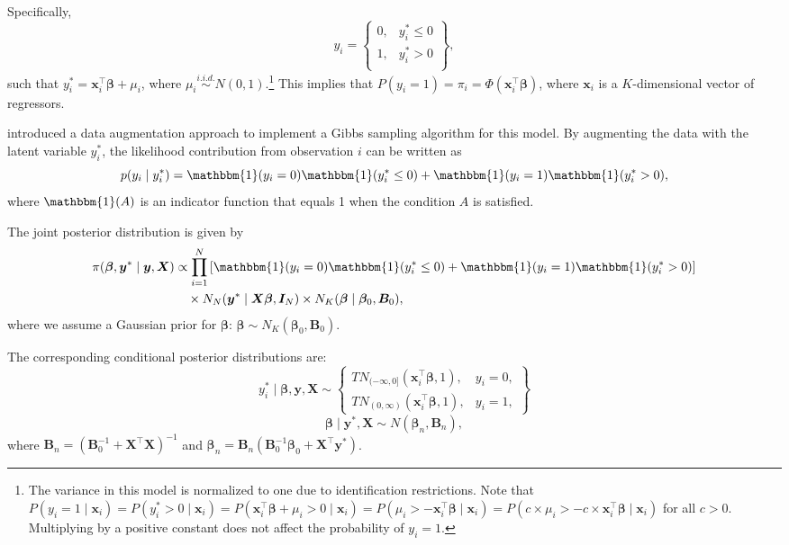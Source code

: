 Specifically,
\begin{equation*}
	y_i =
	\begin{Bmatrix}
		0, & y_i^* \leq 0 \\ 
		1, & y_i^* > 0 \\ 
	\end{Bmatrix},
\end{equation*}
such that $y_i^* = \bm{x}_i^{\top}\bm{\beta} + \mu_i$, where $\mu_i \stackrel{i.i.d.}{\sim} N(0,1)$.\footnote{The variance in this model is normalized to one due to identification restrictions. Note that $P(y_i = 1 \mid \bm{x}_i) = P(y_i^* > 0 \mid \bm{x}_i) = P(\bm{x}_i^{\top}\bm{\beta} + \mu_i > 0 \mid \bm{x}_i) = P(\mu_i > -\bm{x}_i^{\top}\bm{\beta} \mid \bm{x}_i) = P(c \times \mu_i > -c \times \bm{x}_i^{\top}\bm{\beta} \mid \bm{x}_i)$ for all $c > 0$. Multiplying by a positive constant does not affect the probability of $y_i = 1$.} 
This implies that $P(y_i = 1) = \pi_i = \Phi(\bm{x}_i^{\top}\bm{\beta})$, where $\bm{x}_i$ is a $K$-dimensional vector of regressors.

\cite{Albert1993} introduced a data augmentation approach \cite{Tanner1987} to implement a Gibbs sampling algorithm for this model. By augmenting the data with the latent variable $y_i^*$, the likelihood contribution from observation $i$ can be written as
\[
p(y_i \mid y_i^*) = \mathbbm{1}(y_i = 0)\mathbbm{1}(y_i^* \leq 0) + \mathbbm{1}(y_i = 1)\mathbbm{1}(y_i^* > 0),
\]
where $\mathbbm{1}(A)$ is an indicator function that equals 1 when the condition $A$ is satisfied.

The joint posterior distribution is given by
\begin{align*}
	\pi(\bm{\beta}, \bm{y}^* \mid \bm{y}, \bm{X}) 
	&\propto \prod_{i=1}^N 
	\left[\mathbbm{1}(y_i = 0)\mathbbm{1}(y_i^* \leq 0) + \mathbbm{1}(y_i = 1)\mathbbm{1}(y_i^* > 0)\right] \\
	&\quad \times N_N(\bm{y}^* \mid \bm{X}\bm{\beta}, \bm{I}_N) 
	\times N_K(\bm{\beta} \mid \bm{\beta}_0, \bm{B}_0),
\end{align*}
where we assume a Gaussian prior for $\bm{\beta}$: $\bm{\beta} \sim N_K(\bm{\beta}_0, \bm{B}_0)$.

The corresponding conditional posterior distributions are:
\begin{equation*}
	y_i^* \mid \bm{\beta}, \bm{y}, \bm{X} \sim
	\begin{Bmatrix}
		TN_{(-\infty, 0]}(\bm{x}_i^{\top}\bm{\beta}, 1), & y_i = 0, \\ 
		TN_{(0, \infty)}(\bm{x}_i^{\top}\bm{\beta}, 1), & y_i = 1,
	\end{Bmatrix}
\end{equation*}
\begin{equation*}
	\bm{\beta} \mid \bm{y}^*, \bm{X} \sim N(\bm{\beta}_n, \bm{B}_n),
\end{equation*}
where $\bm{B}_n = (\bm{B}_0^{-1} + \bm{X}^{\top}\bm{X})^{-1}$ and 
$\bm{\beta}_n = \bm{B}_n(\bm{B}_0^{-1}\bm{\beta}_0 + \bm{X}^{\top}\bm{y}^*)$.\\


